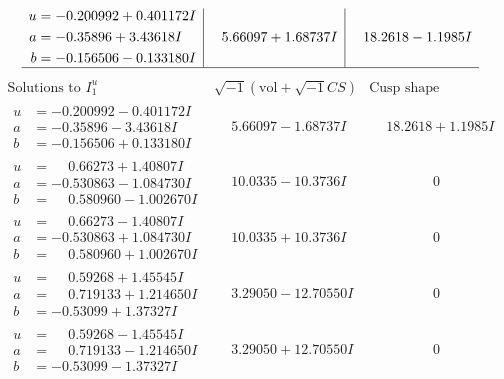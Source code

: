 \documentclass[1p]{elsarticle_modified}
\theoremstyle{definition}
\newcommand{\I}{\sqrt{-1}}
\begin{document}
$$\begin{array}{c|c|c}
\begin{aligned}
u &= -0.200992 + 0.401172 I \\
a &= -0.35896 + 3.43618 I \\
b &= -0.156506 - 0.133180 I\end{aligned}
 & \phantom{-}5.66097 + 1.68737 I & \phantom{-}18.2618 - 1.1985 I\\
 \hline 
 \end{array}$$\newpage$$\begin{array}{c|c|c}  
\text{Solutions to }I^u_{1}& \I (\text{vol} + \sqrt{-1}CS) & \text{Cusp shape}\\
 \hline 
\begin{aligned}
u &= -0.200992 - 0.401172 I \\
a &= -0.35896 - 3.43618 I \\
b &= -0.156506 + 0.133180 I\end{aligned}
 & \phantom{-}5.66097 - 1.68737 I & \phantom{-}18.2618 + 1.1985 I \\ \hline\begin{aligned}
u &= \phantom{-}0.66273 + 1.40807 I \\
a &= -0.530863 - 1.084730 I \\
b &= \phantom{-}0.580960 - 1.002670 I\end{aligned}
 & \phantom{-}10.0335 - 10.3736 I & \phantom{-0.000000 } 0 \\ \hline\begin{aligned}
u &= \phantom{-}0.66273 - 1.40807 I \\
a &= -0.530863 + 1.084730 I \\
b &= \phantom{-}0.580960 + 1.002670 I\end{aligned}
 & \phantom{-}10.0335 + 10.3736 I & \phantom{-0.000000 } 0 \\ \hline\begin{aligned}
u &= \phantom{-}0.59268 + 1.45545 I \\
a &= \phantom{-}0.719133 + 1.214650 I \\
b &= -0.53099 + 1.37327 I\end{aligned}
 & \phantom{-}3.29050 - 12.70550 I & \phantom{-0.000000 } 0 \\ \hline\begin{aligned}
u &= \phantom{-}0.59268 - 1.45545 I \\
a &= \phantom{-}0.719133 - 1.214650 I \\
b &= -0.53099 - 1.37327 I\end{aligned}
 & \phantom{-}3.29050 + 12.70550 I & \phantom{-0.000000 } 0 \\ \hline\begin{aligned}

\end{aligned}
\end{array}$$
\end{document}
